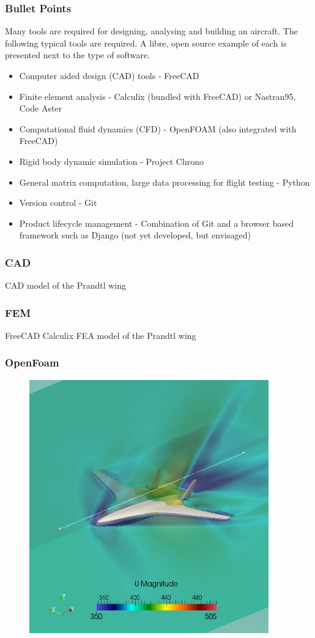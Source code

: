 \documentclass{beamer}
\begin{document}
\begin{frame}
\frametitle{Bullet Points}

Many tools are required for designing, analysing and building an aircraft.  The following typical tools are required.  A libre, open source example of each is presented next to the type of software.

\begin{itemize}
\item Computer aided design (CAD) tools - FreeCAD
\item Finite element analysis - Calculix (bundled with FreeCAD) or Nastran95, Code Aster
\item Computational fluid dynamics (CFD) - OpenFOAM (also integrated with FreeCAD)
\item Rigid body dynamic simulation - Project Chrono
\item General matrix computation, large data processing for flight testing - Python
\item Version control - Git
\item Product lifecycle management - Combination of Git and a browser based framework such as Django (not yet developed, but envisaged)
\end{itemize}
\end{frame}

\begin{frame}
\frametitle{CAD}

CAD model of the Prandtl wing

\end{frame}


\begin{frame}
\frametitle{FEM}

FreeCAD Calculix FEA model of the Prandtl wing

\end{frame}

\begin{frame}
\frametitle{OpenFoam}

\begin{figure}
\includegraphics[width=0.4\linewidth]{Pictures/OpenFoamBWB.png}
\end{figure}

\end{frame}
\end{document}
